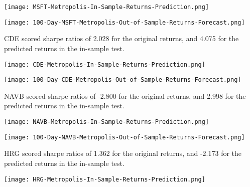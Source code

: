 \begin{center}
    \texttt{[image: MSFT-Metropolis-In-Sample-Returns-Prediction.png]}
    \label{fig:nonfloat}
\end{center}

\begin{center}  
    \texttt{[image: 100-Day-MSFT-Metropolis-Out-of-Sample-Returns-Forecast.png]}
    \label{fig:nonfloat}
\end{center}

CDE scored sharpe ratios of 2.028 for the original returns, and 4.075 for the predicted returns in the in-sample test.

\begin{center}
    \texttt{[image: CDE-Metropolis-In-Sample-Returns-Prediction.png]}
    \label{fig:nonfloat}
\end{center}

\begin{center}  
    \texttt{[image: 100-Day-CDE-Metropolis-Out-of-Sample-Returns-Forecast.png]}
    \label{fig:nonfloat}
\end{center}

NAVB scored sharpe ratios of -2.800 for the original returns, and 2.998 for the predicted returns in the in-sample test.

\begin{center}
    \texttt{[image: NAVB-Metropolis-In-Sample-Returns-Prediction.png]}
    \label{fig:nonfloat}
\end{center}

\begin{center}  
    \texttt{[image: 100-Day-NAVB-Metropolis-Out-of-Sample-Returns-Forecast.png]}
    \label{fig:nonfloat}
\end{center}

HRG scored sharpe ratios of 1.362 for the original returns, and -2.173 for the predicted returns in the in-sample test.

\begin{center}
    \texttt{[image: HRG-Metropolis-In-Sample-Returns-Prediction.png]}
    \label{fig:nonfloat}
\end{center}

